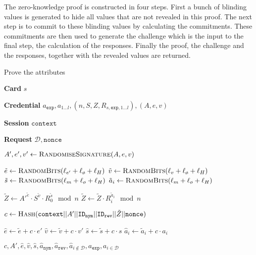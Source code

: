 The zero-knowledge proof is constructed in four steps. First a bunch of blinding values is generated to hide all values that are not revealed in this proof. The next step is to commit to these blinding values by calculating the commitments. These commitments are then used to generate the challenge which is the input to the final step, the calculation of the responses. Finally the proof, the challenge and the responses, together with the revealed values are returned.

\begin{algorithm}
  \caption{Prove the attributes}
  \label{alg:proof}
  \addtolength{\baselineskip}{1mm}
  \begin{algorithmic}[1]

    \item[\textbf{Card}] $s$
    \item[\textbf{Credential}] $a_\mathtt{exp}, a_{1 \dots l}, (n, S, Z, R_{s, \mathtt{exp}, 1 \dots l}), (A, e, v)$
    \item[\textbf{Session}] $\mathtt{context}$
    \item[\textbf{Request}] $\mathcal{D}, \mathtt{nonce}$

    \Statex
      \State $A', e', v' \gets \Call{RandomiseSignature}{A, e, v}$

      \Statex {}
      \State $\tilde{e} \gets \Call{RandomBits}{\ell_{e'} + \ell_{\text{\o}} + \ell_{H}}$
      \State $\tilde{v} \gets \Call{RandomBits}{\ell_{v} + \ell_{\o} + \ell_{H}}$
      \State $\tilde{s} \gets \Call{RandomBits}{\ell_{m} + \ell_{\o} + \ell_{H}}$
       
        \State $\tilde{a}_i \gets \Call{RandomBits}{\ell_{m} + \ell_{\o} + \ell_{H}}$
      \EndFor

      \Statex {}
      \State $\tilde{Z} \gets {A'}^{\tilde{e}} \cdot S^{\tilde{v}} \cdot R_0^{\tilde{s}} \mod n$
       
        \State $\tilde{Z} \gets \tilde{Z} \cdot R_i^{\tilde{a}_i} \mod n$
      \EndFor

      \Statex {}
      \State $c \gets \Call{Hash}{\mathtt{context} || A' || \mathtt{ID_{nym}} || \mathtt{ID_{rev}} ||
        \tilde{Z} || \mathtt{nonce}}$

      \Statex {}
      \State $\hat{e} \gets \tilde{e} + c \cdot e'$
      \State $\hat{v} \gets \tilde{v} + c \cdot v'$
      \State $\hat{s} \gets \tilde{s} + c \cdot s$
       
        \State $\hat{a}_i \gets \tilde{a}_i + c \cdot a_i$
      \EndFor

      \Statex
      \Return $c, A', \hat{e}, \hat{v}, \hat{s}, \hat{a}_\mathtt{nym}, \hat{a}_\mathtt{rev}, \hat{a}_{i \notin \mathcal{D}}, a_\mathtt{exp}, a_{i \in \mathcal{D}}$
    \EndFunction
  \end{algorithmic}
\end{algorithm}

